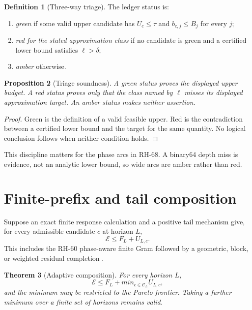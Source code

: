 \documentclass[11pt]{article}
\newtheorem{theorem}{Theorem}[section]
\newtheorem{proposition}[theorem]{Proposition}
\theoremstyle{definition}
\newtheorem{definition}[theorem]{Definition}
\begin{document}
\begin{definition}[Three-way triage]
\label{def:triage}
The ledger status is:
\begin{enumerate}[leftmargin=2.2em]
 \item \emph{green} if some valid upper candidate has
       $U_c\le\tau$ and $b_{c,j}\le B_j$ for every $j$;
 \item \emph{red for the stated approximation class} if no candidate is green
       and a certified lower bound satisfies $\ell>\delta$;
 \item \emph{amber} otherwise.
\end{enumerate}
\end{definition}

\begin{proposition}[Triage soundness]
\label{prop:triage}
A green status proves the displayed upper budget.  A red status proves only
that the class named by $\ell$ misses its displayed approximation target.
An amber status makes neither assertion.
\end{proposition}

\begin{proof}
Green is the definition of a valid feasible upper.  Red is the contradiction
between a certified lower bound and the target for the same quantity.  No
logical conclusion follows when neither condition holds.
\end{proof}

This discipline matters for the phase arcs in RH-68.  A binary64 depth miss
is evidence, not an analytic lower bound, so wide arcs are amber rather than
red.

\section{Finite-prefix and tail composition}
\label{sec:composition}

Suppose an exact finite response calculation and a positive tail mechanism
give, for every admissible candidate $c$ at horizon $L$,
\begin{equation}
 \mathcal E\le F_L+U_{L,c}.
 \label{eq:prefix-tail}
\end{equation}
This includes the RH-60 phase-aware finite Gram followed by a geometric,
block, or weighted residual completion \citep{WangPhaseTail2026}.

\begin{theorem}[Adaptive composition]
\label{thm:composition}
For every horizon $L$,
\begin{equation}
 \mathcal E\le F_L+min_{c\in\mathcal C_L}U_{L,c},
 \label{eq:adaptive-upper}
\end{equation}
and the minimum may be restricted to the Pareto frontier.  Taking a further
minimum over a finite set of horizons remains valid.
\end{theorem}
\end{document}
